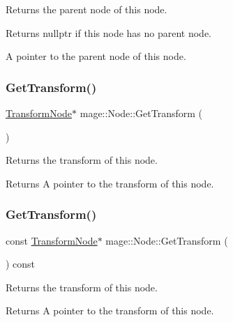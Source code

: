 Returns the parent node of this node.

\begin{DoxyReturn}{Returns}
{\ttfamily nullptr} if this node has no parent node. 

A pointer to the parent node of this node. 
\end{DoxyReturn}
\hypertarget{classmage_1_1_node_ab789d7674ed06d3e10114dd6d4b4334c}{}\label{classmage_1_1_node_ab789d7674ed06d3e10114dd6d4b4334c} 
\subsubsection{\texorpdfstring{Get\+Transform()}{GetTransform()}\hspace{0.1cm}{\footnotesize\ttfamily [1/2]}}
{\footnotesize\ttfamily \hyperlink{classmage_1_1_transform_node}{Transform\+Node}$\ast$ mage\+::\+Node\+::\+Get\+Transform (\begin{DoxyParamCaption}{ }\end{DoxyParamCaption})\hspace{0.3cm}{\ttfamily [noexcept]}}

Returns the transform of this node.

\begin{DoxyReturn}{Returns}
A pointer to the transform of this node. 
\end{DoxyReturn}
\hypertarget{classmage_1_1_node_acbffccfec34313d8583546204c3d9fda}{}\label{classmage_1_1_node_acbffccfec34313d8583546204c3d9fda} 
\subsubsection{\texorpdfstring{Get\+Transform()}{GetTransform()}\hspace{0.1cm}{\footnotesize\ttfamily [2/2]}}
{\footnotesize\ttfamily const \hyperlink{classmage_1_1_transform_node}{Transform\+Node}$\ast$ mage\+::\+Node\+::\+Get\+Transform (\begin{DoxyParamCaption}{ }\end{DoxyParamCaption}) const\hspace{0.3cm}{\ttfamily [noexcept]}}

Returns the transform of this node.

\begin{DoxyReturn}{Returns}
A pointer to the transform of this node. 
\end{DoxyReturn}
\hypertarget{classmage_1_1_node_a21ca020ee56a4fce4148c9902b97b2ec}{}\label{classmage_1_1_node_a21ca020ee56a4fce4148c9902b97b2ec} 
